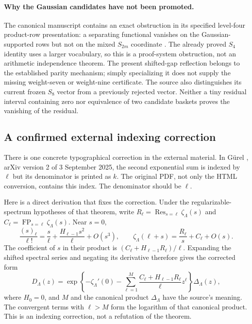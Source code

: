 \documentclass[11pt,letterpaper]{article}
\numberwithin{equation}{section}
\theoremstyle{plain}
\theoremstyle{definition}
\theoremstyle{remark}
\DeclareMathOperator{\FP}{FP}
\newcommand{\src}[1]{\nolinkurl{#1}}
\begin{document}
\paragraph{Why the Gaussian candidates have not been promoted.}
The canonical manuscript contains an exact obstruction in its specified
level-four product-row presentation: a separating functional vanishes on
the Gaussian-supported rows but not on the mixed $S_{2m}$ coordinate
\cite[\src{chapters/05-level4-rank.tex}]{repo}.
The already proved $S_4$ identity uses a larger vocabulary, so this is
a proof-system obstruction, not an arithmetic independence theorem.
The present shifted-gap reflection belongs to the established parity
mechanism; simply specializing it does not supply the missing
weight-seven or weight-nine certificate. The source also distinguishes
its current frozen $S_8$ vector from a previously rejected vector.
Neither a tiny residual interval containing zero nor equivalence of two
candidate baskets proves the vanishing of the residual.

\subsection{A confirmed external indexing correction}

There is one concrete typographical correction in the external material.
In G\"urel \cite[Theorem 1.1, printed p.~2]{gurel}, arXiv version 2 of
3 September 2025, the second exponential sum is indexed by $\ell$ but
its denominator is printed as $k$. The original PDF, not only the HTML
conversion, contains this index. The denominator should be $\ell$.

Here is a direct derivation that fixes the correction. Under the
regularizable-spectrum hypotheses of that theorem, write
$R_\ell=\operatorname{Res}_{s=\ell}\zeta_\Lambda(s)$ and
$C_\ell=\FP_{s=\ell}\zeta_\Lambda(s)$. Near $s=0$,
\[
 \frac{(s)_\ell}{\ell!}
       =\frac{s}{\ell}+\frac{H_{\ell-1}s^2}{\ell}+O(s^3),
 \qquad
 \zeta_\Lambda(\ell+s)=\frac{R_\ell}{s}+C_\ell+O(s).
\]
The coefficient of $s$ in their product is
$(C_\ell+H_{\ell-1}R_\ell)/\ell$. Expanding the shifted spectral
series and negating its derivative therefore gives the corrected form
\begin{equation}\label{eq:Gurel-correction}
 D_\Lambda(z)=\exp\left\{-\zeta_\Lambda'(0)
  -\sum_{\ell=1}^{M}
     \frac{C_\ell+H_{\ell-1}R_\ell}{\ell}z^\ell\right\}
                                                    \Delta_\Lambda(z),
\end{equation}
where $H_0=0$, and $M$ and the canonical product $\Delta_\Lambda$
have the source's meaning. The convergent terms with $\ell>M$ form
the logarithm of that canonical product. This is an indexing correction,
not a refutation of the theorem.
\end{document}
